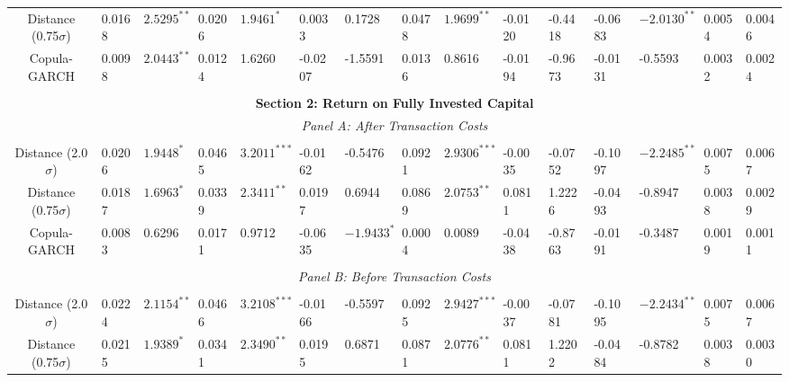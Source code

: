 \documentclass[a4paper]{article}
\begin{document}
\begin{sidewaystable}
\begin{threeparttable}[H]
\begin{tabularx}{\textwidth}{@{\extracolsep{\fill}}lllllllllllllll@{}}
			\multicolumn{1}{c}{Distance (0.75$\sigma$)} & 0.0168 & $2.5295^{**}$ & 0.0206 & $1.9461^{*}$ & 0.0033 & 0.1728 & 0.0478 & $1.9699^{**}$ & -0.0120 & -0.4418 & -0.0683 & $-2.0130^{**}$ & 0.0054 & 0.0046 \\
			\multicolumn{1}{c}{Copula-GARCH} & 0.0098 & $2.0443^{**}$ & 0.0124 & 1.6260 & -0.0207 & -1.5591 & 0.0136 & 0.8616 & -0.0194 & -0.9673 & -0.0131 & -0.5593 & 0.0032 & 0.0024 \\
			&       &       &       &       &       &       &       &       &       &       &       &       &       &  \\
			\multicolumn{15}{c}{\textbf{Section 2: Return on Fully Invested Capital}} \\
			\multicolumn{15}{c}{\textit{Panel A: After Transaction Costs}} \\
			&       &       &       &       &       &       &       &       &       &       &       &       &       &  \\
			\multicolumn{1}{c}{Distance (2.0$\sigma$)} & 0.0206 & $1.9448^{*}$ & 0.0465 & $3.2011^{***}$ & -0.0162 & -0.5476 & 0.0921 & $2.9306^{***}$ & -0.0035 & -0.0752 & -0.1097 & $-2.2485^{**}$ & 0.0075 & 0.0067 \\
			\multicolumn{1}{c}{Distance (0.75$\sigma$)} & 0.0187 & $1.6963^{*}$ & 0.0339 & $2.3411^{**}$ & 0.0197 & 0.6944 & 0.0869 & $2.0753^{**}$ & 0.0811 & 1.2226 & -0.0493 & -0.8947 & 0.0038 & 0.0029 \\
			\multicolumn{1}{c}{Copula-GARCH} & 0.0083 & 0.6296 & 0.0171 & 0.9712 & -0.0635 & $-1.9433^{*}$ & 0.0004 & 0.0089 & -0.0438 & -0.8763 & -0.0191 & -0.3487 & 0.0019 & 0.0011 \\
			&       &       &       &       &       &       &       &       &       &       &       &       &       &  \\
			\multicolumn{15}{c}{\textit{Panel B: Before Transaction Costs}} \\
			&       &       &       &       &       &       &       &       &       &       &       &       &       &  \\
			\multicolumn{1}{c}{Distance (2.0$\sigma$)}& 0.0224 & $2.1154^{**}$ & 0.0466 & $3.2108^{***}$ & -0.0166 & -0.5597 & 0.0925 & $2.9427^{***}$ & -0.0037 & -0.0781 & -0.1095 & $-2.2434^{**}$ & 0.0075 & 0.0067 \\
			\multicolumn{1}{c}{Distance (0.75$\sigma$)} & 0.0215 & $1.9389^{*}$ & 0.0341 & $2.3490^{**}$ & 0.0195 & 0.6871 & 0.0871 & $2.0776^{**}$ & 0.0811 & 1.2202 & -0.0484 & -0.8782 & 0.0038 & 0.0030 \\

\end{tabularx}
\end{threeparttable}
\end{sidewaystable}
\end{document}
